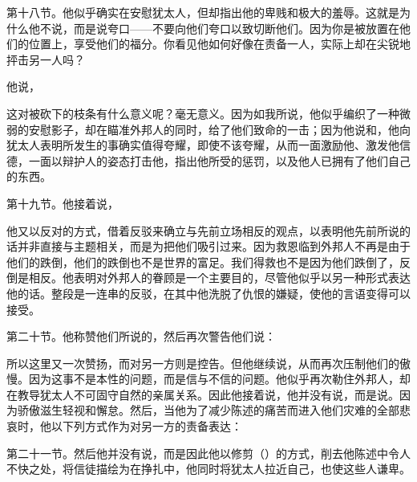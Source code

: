 第十八节。他似乎确实在安慰犹太人，但却指出他的卑贱和极大的羞辱。这就是为什么他不说，而是说夸口——不要向他们夸口以致切断他们。因为你是被放置在他们的位置上，享受他们的福分。你看见他如何好像在责备一人，实际上却在尖锐地抨击另一人吗？\par

他说，\par

这对被砍下的枝条有什么意义呢？毫无意义。因为如我所说，他似乎编织了一种微弱的安慰影子，却在瞄准外邦人的同时，给了他们致命的一击；因为他说和，他向犹太人表明所发生的事确实值得夸耀，即使不该夸耀，从而一面激励他、激发他信德，一面以辩护人的姿态打击他，指出他所受的惩罚，以及他人已拥有了他们自己的东西。\par

第十九节。他接着说，\par

他又以反对的方式，借着反驳来确立与先前立场相反的观点，以表明他先前所说的话并非直接与主题相关，而是为把他们吸引过来。因为救恩临到外邦人不再是由于他们的跌倒，他们的跌倒也不是世界的富足。我们得救也不是因为他们跌倒了，反倒是相反。他表明对外邦人的眷顾是一个主要目的，尽管他似乎以另一种形式表达他的话。整段是一连串的反驳，在其中他洗脱了仇恨的嫌疑，使他的言语变得可以接受。\par

第二十节。他称赞他们所说的，然后再次警告他们说：\par

所以这里又一次赞扬，而对另一方则是控告。但他继续说，从而再次压制他们的傲慢。因为这事不是本性的问题，而是信与不信的问题。他似乎再次勒住外邦人，却在教导犹太人不可固守自然的亲属关系。因此他接着说，他并没有说，而是说。因为骄傲滋生轻视和懈怠。然后，当他为了减少陈述的痛苦而进入他们灾难的全部悲哀时，他以下列方式作为对另一方的责备表达：\par

第二十一节。然后他并没有说，而是因此他以修剪（）的方式，削去他陈述中令人不快之处，将信徒描绘为在挣扎中，他同时将犹太人拉近自己，也使这些人谦卑。\par


